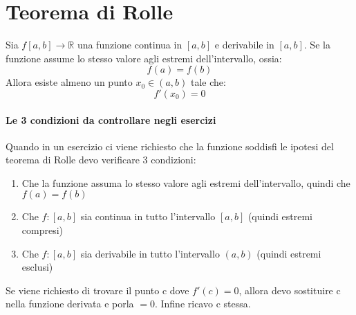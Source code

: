 \section{Teorema di Rolle}
Sia $f[a,b]\rightarrow \mathbb{R}$ una funzione continua in $[a,b]$ e
derivabile in $[a,b]$. Se la funzione assume lo stesso valore agli estremi
dell'intervallo, ossia:
\[
	f(a)=f(b)
\]
Allora esiste almeno un punto $x_0 \in (a, b)$ tale che:
\[
	f'(x_0) = 0
\]
\paragraph*{Le 3 condizioni da controllare negli esercizi}
Quando in un esercizio ci viene richiesto che la funzione soddisfi le ipotesi del
teorema di Rolle devo verificare 3 condizioni:
\begin{enumerate}
	\item Che la funzione assuma lo stesso valore agli estremi dell'intervallo, quindi che $f(a) = f(b)$
	\item Che $f:[a,b]$ sia continua in tutto l'intervallo $[a,b]$ (quindi estremi compresi)
	\item Che $f:[a,b]$ sia derivabile in tutto l'intervallo $(a,b)$ (quindi estremi esclusi)
\end{enumerate}
Se viene richiesto di trovare il punto c dove $f'(c) = 0$, allora devo
sostituire c nella funzione derivata e porla $= 0$. Infine ricavo c stessa.

